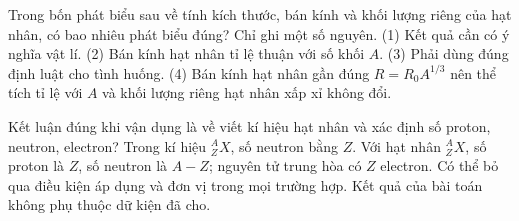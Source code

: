 \begin{ex}
Trong bốn phát biểu sau về tính kích thước, bán kính và khối lượng riêng của hạt nhân, có bao nhiêu phát biểu đúng? Chỉ ghi một số nguyên. (1) Kết quả cần có ý nghĩa vật lí. (2) Bán kính hạt nhân tỉ lệ thuận với số khối $A$. (3) Phải dùng đúng định luật cho tình huống. (4) Bán kính hạt nhân gần đúng $R=R_0A^{1/3}$ nên thể tích tỉ lệ với $A$ và khối lượng riêng hạt nhân xấp xỉ không đổi.
\end{ex}

\begin{ex}
Kết luận đúng khi vận dụng là về viết kí hiệu hạt nhân và xác định số proton, neutron, electron?
\choice
{Trong kí hiệu $^{A}_{Z}X$, số neutron bằng $Z$.}
{\True Với hạt nhân $^{A}_{Z}X$, số proton là $Z$, số neutron là $A-Z$; nguyên tử trung hòa có $Z$ electron.}
{Có thể bỏ qua điều kiện áp dụng và đơn vị trong mọi trường hợp.}
{Kết quả của bài toán không phụ thuộc dữ kiện đã cho.}
\end{ex}

